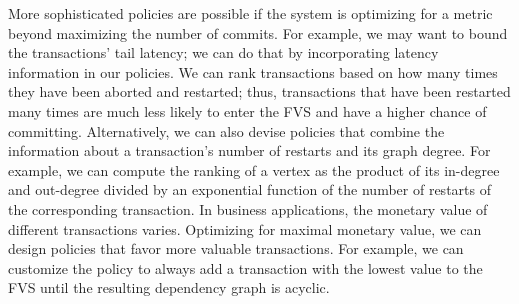 More sophisticated policies are possible if the system is optimizing for a metric beyond maximizing the number of commits. For example, we may want to bound the transactions' tail latency; we can do that by incorporating latency information in our policies. We can rank transactions based on how many times they have been aborted and restarted; thus, transactions that have been restarted many times are much less likely to enter the FVS and have a higher chance of committing. Alternatively, we can also devise policies that combine the information about a transaction's number of restarts and its graph degree. For example, we can compute the ranking of a vertex as the product of its in-degree and out-degree divided by an exponential function of the number of restarts of the corresponding transaction. 
In business applications, the monetary value of different transactions varies. Optimizing for maximal monetary value, we can design policies that favor more valuable transactions. For example, we can customize the policy to always add a transaction with the lowest value to the FVS until the resulting dependency graph is acyclic.



